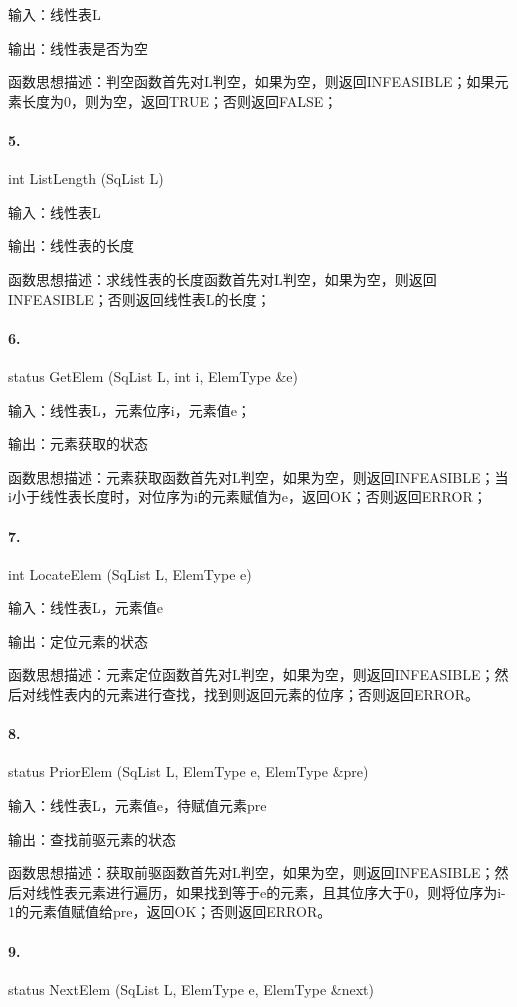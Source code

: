 \documentclass[supercite]{Experimental_Report}
\theoremstyle{definition}
\begin{document}
输入：线性表L

输出：线性表是否为空

函数思想描述：判空函数首先对L判空，如果为空，则返回INFEASIBLE；如果元素长度为0，则为空，返回TRUE；否则返回FALSE；

\paragraph{ 5.}int ListLength (SqList L)

输入：线性表L

输出：线性表的长度

函数思想描述：求线性表的长度函数首先对L判空，如果为空，则返回INFEASIBLE；否则返回线性表L的长度；

\paragraph{ 6.}status GetElem (SqList L, int i, ElemType \&e)

输入：线性表L，元素位序i，元素值e；

输出：元素获取的状态

函数思想描述：元素获取函数首先对L判空，如果为空，则返回INFEASIBLE；当i小于线性表长度时，对位序为i的元素赋值为e，返回OK；否则返回ERROR；

\paragraph{ 7.}int LocateElem (SqList L, ElemType e)

输入：线性表L，元素值e

输出：定位元素的状态

函数思想描述：元素定位函数首先对L判空，如果为空，则返回INFEASIBLE；然后对线性表内的元素进行查找，找到则返回元素的位序；否则返回ERROR。

\paragraph{ 8.}status PriorElem (SqList L, ElemType e, ElemType \&pre)

输入：线性表L，元素值e，待赋值元素pre

输出：查找前驱元素的状态

函数思想描述：获取前驱函数首先对L判空，如果为空，则返回INFEASIBLE；然后对线性表元素进行遍历，如果找到等于e的元素，且其位序大于0，则将位序为i-1的元素值赋值给pre，返回OK；否则返回ERROR。

\paragraph{ 9.}status NextElem (SqList L, ElemType e, ElemType \&next)
\end{document}
